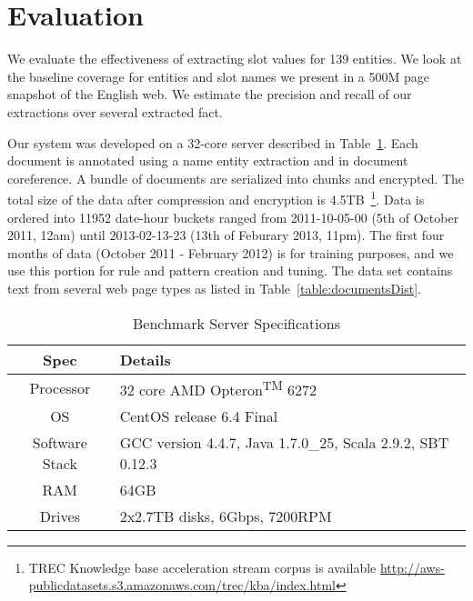 
\section{Evaluation}
\label{sec:results}

We evaluate the effectiveness of extracting slot values for 139 entities.
We look at the baseline coverage for entities and slot names we present in a 500M page snapshot of the English web.
We estimate the precision and recall of our extractions over several extracted fact. 


Our system was developed on a 32-core server described in Table~\ref{table:serverspec}.
Each document is annotated using a name entity extraction and in document coreference.
A bundle of documents are serialized into chunks and encrypted.
The total size of the data after compression and encryption is 4.5TB~\footnote{TREC Knowledge base acceleration stream corpus is available  \url{http://aws-publicdatasets.s3.amazonaws.com/trec/kba/index.html}}.
Data is ordered into 11952 date-hour buckets ranged from 2011-10-05-00 (5th of October 2011, 12am)
until 2013-02-13-23 (13th of Feburary 2013, 11pm).
The first four months of data (October 2011 - February 2012) is for training purposes, 
and we use this portion for rule and pattern creation and tuning.
The data set contains text from several web page types as listed in Table~\ref{table:documentsDist}.
 
\begin{table}
\caption{Benchmark Server Specifications}
\centering
\label{table:serverspec}
\begin{tabular}{| c | p{4.8cm} |}
\hline 
\textbf{Spec} & \textbf{Details} \\ \hline
Processor & 32 core AMD Opteron\textsuperscript{TM} 6272 \\ \hline 
OS & CentOS release 6.4 Final \\ \hline 
Software Stack & GCC version 4.4.7, Java 1.7.0\_25, Scala 2.9.2, SBT 0.12.3 \\ \hline 
 RAM & 64GB\\ \hline 
 Drives & 2x2.7TB disks, 6Gbps, 7200RPM\\ \hline 
\end{tabular} 
\end{table}
 
